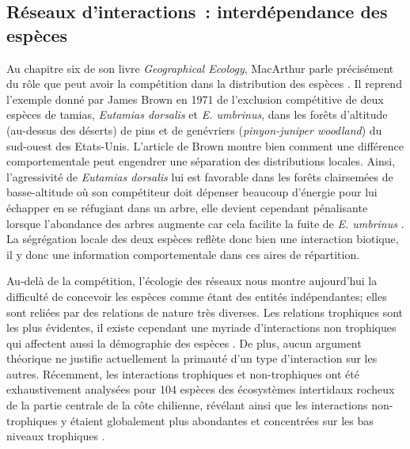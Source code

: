 \subsection*{Réseaux d'interactions~: interdépendance des
espèces}\label{ruxe9seaux-dinteractions-interduxe9pendance-des-espuxe8ces}

Au chapitre six de son livre \emph{Geographical Ecology}, MacArthur
parle précisément du rôle que peut avoir la compétition dans la
distribution des espèces \citep{macarthur1972geographical}. Il reprend
l'exemple donné par James Brown en 1971 de l'exclusion compétitive de
deux espèces de tamias, \emph{Eutamias dorsalis} et \emph{E. umbrinus},
dans les forêts d'altitude (au-dessus des déserts) de pins et de
genévriers (\emph{pinyon-juniper woodland}) du sud-ouest des Etats-Unis.
L'article de Brown montre bien comment une différence comportementale
peut engendrer une séparation des distributions locales. Ainsi,
l'agressivité de \emph{Eutamias dorsalis} lui est favorable dans les
forêts clairsemées de basse-altitude où son compétiteur doit dépenser
beaucoup d'énergie pour lui échapper en se réfugiant dans un arbre, elle
devient cependant pénalisante lorsque l'abondance des arbres augmente
car cela facilite la fuite de \emph{E. umbrinus} \citep{Brown1971}. La
ségrégation locale des deux espèces reflète donc bien une interaction
biotique, il y donc une information comportementale dans ces aires de
répartition.

Au-delà de la compétition, l'écologie des réseaux nous montre
aujourd'hui la difficulté de concevoir les espèces comme étant des
entités indépendantes; elles sont reliées par des relations de nature
très diverses. Les relations trophiques sont les plus évidentes, il
existe cependant une myriade d'interactions non trophiques qui affectent
aussi la démographie des espèces \citep[voir][ pour une réflexion sur le
sujet et une classification de ces interactions]{Kefi2012}. De plus,
aucun argument théorique ne justifie actuellement la primauté d'un type
d'interaction sur les autres. Récemment, les interactions trophiques et
non-trophiques ont été exhaustivement analysées pour 104 espèces des
écosystèmes intertidaux rocheux de la partie centrale de la côte
chilienne, révélant ainsi que les interactions non-trophiques y étaient
globalement plus abondantes et concentrées sur les bas niveaux
trophiques \citep{Kefi2015}.

